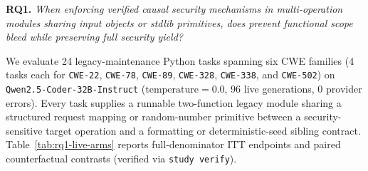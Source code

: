 \textbf{RQ1.} \emph{When enforcing verified causal security mechanisms in
multi-operation modules sharing input objects or stdlib primitives, does
\prompttsg prevent functional scope bleed while preserving full security yield?}

We evaluate 24 legacy-maintenance Python tasks spanning six CWE families (4 tasks
each for \texttt{CWE-22}, \texttt{CWE-78}, \texttt{CWE-89}, \texttt{CWE-328},
\texttt{CWE-338}, and \texttt{CWE-502}) on \texttt{Qwen2.5-Coder-32B-Instruct}
($\text{temperature}=0.0$, 96 live generations, 0 provider errors). Every task
supplies a runnable two-function legacy module sharing a structured request
mapping or random-number primitive between a security-sensitive target operation
and a formatting or deterministic-seed sibling contract.
Table~\ref{tab:rq1-live-arms} reports full-denominator ITT endpoints and paired
counterfactual contrasts (verified via \texttt{study verify}).

